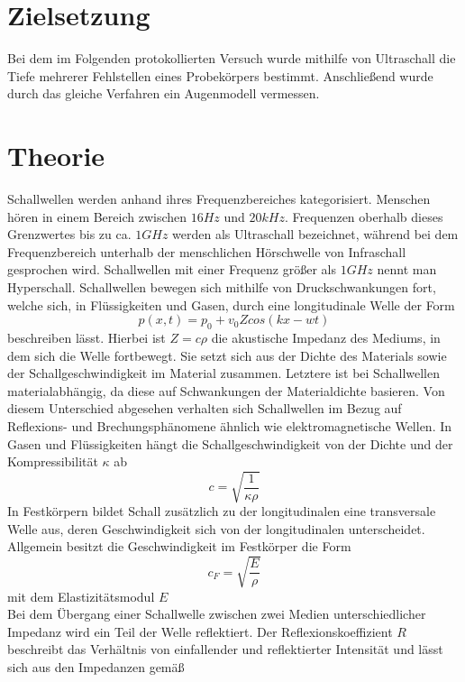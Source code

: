 \section{Zielsetzung}
Bei dem im Folgenden protokollierten Versuch wurde mithilfe von Ultraschall die Tiefe mehrerer Fehlstellen eines Probekörpers bestimmt. Anschließend wurde durch das gleiche Verfahren ein Augenmodell vermessen. 
\section{Theorie}
\label{sec:theorie}
Schallwellen werden anhand ihres Frequenzbereiches kategorisiert. Menschen hören in einem Bereich zwischen $16Hz$ und $20 kHz$. Frequenzen oberhalb dieses Grenzwertes bis zu ca. $1 GHz$ werden als Ultraschall bezeichnet, während bei dem Frequenzbereich unterhalb der menschlichen Hörschwelle von Infraschall gesprochen wird. Schallwellen mit einer Frequenz größer als $1 GHz$ nennt man Hyperschall.  
Schallwellen bewegen sich mithilfe von Druckschwankungen fort, welche sich, in Flüssigkeiten und Gasen, durch eine longitudinale Welle der Form
\begin{equation}
p(x,t)=p_0+v_0Zcos(kx-wt)
\end{equation}
beschreiben lässt. Hierbei ist $Z=c\rho$ die akustische Impedanz des Mediums, in dem sich die Welle fortbewegt. Sie setzt sich aus der Dichte des Materials sowie der Schallgeschwindigkeit im Material zusammen. Letztere ist bei Schallwellen materialabhängig, da diese auf Schwankungen der Materialdichte basieren. Von diesem Unterschied abgesehen verhalten sich Schallwellen im Bezug auf Reflexions- und Brechungsphänomene ähnlich wie elektromagnetische Wellen. 
In Gasen und Flüssigkeiten hängt die Schallgeschwindigkeit von der Dichte und der Kompressibilität $\kappa$ ab
\begin{equation}
c=\sqrt{\frac{1}{\kappa \rho}}
\end{equation}
In Festkörpern bildet Schall zusätzlich zu der longitudinalen eine transversale Welle aus, deren Geschwindigkeit sich von der longitudinalen unterscheidet. Allgemein besitzt die Geschwindigkeit im Festkörper die Form
\begin{equation}
c_F=\sqrt{\frac{E}{\rho}}
\end{equation}
mit dem Elastizitätsmodul $E$ \\
Bei dem Übergang einer Schallwelle zwischen zwei Medien unterschiedlicher Impedanz wird ein Teil der Welle reflektiert. Der Reflexionskoeffizient $R$ beschreibt das Verhältnis von einfallender und reflektierter Intensität und lässt sich aus den Impedanzen gemäß
